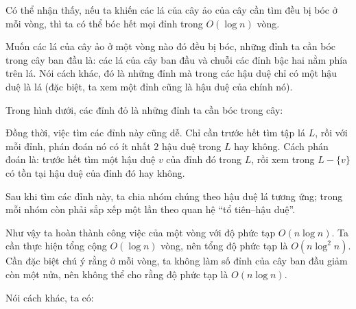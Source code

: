 \documentclass[11pt]{article}
\begin{document}
Có thể nhận thấy, nếu ta khiến các lá của cây ảo của cây cần tìm đều bị bóc ở
mỗi vòng, thì ta có thể bóc hết mọi đỉnh trong \(O(\log n)\) vòng.

Muốn các lá của cây ảo ở một vòng nào đó đều bị bóc, những đỉnh ta cần bóc
trong cây ban đầu là: các lá của cây ban đầu và chuỗi các đỉnh bậc hai nằm phía
trên lá. Nói cách khác, đó là những đỉnh mà trong các hậu duệ chỉ có một hậu duệ
là lá (đặc biệt, ta xem một đỉnh cũng là hậu duệ của chính nó).

Trong hình dưới, các đỉnh đỏ là những đỉnh ta cần bóc trong cây:

\begin{center}
\end{center}

Đồng thời, việc tìm các đỉnh này cũng dễ. Chỉ cần trước hết tìm tập lá \(L\),
rồi với mỗi đỉnh, phán đoán nó có ít nhất \(2\) hậu duệ trong \(L\) hay không.
Cách phán đoán là: trước hết tìm một hậu duệ \(v\) của đỉnh đó trong \(L\), rồi
xem trong \(L-\{v\}\) có tồn tại hậu duệ của đỉnh đó hay không.

Sau khi tìm các đỉnh này, ta chia nhóm chúng theo hậu duệ lá tương ứng; trong
mỗi nhóm còn phải sắp xếp một lần theo quan hệ ``tổ tiên--hậu duệ''.

Như vậy ta hoàn thành công việc của một vòng với độ phức tạp \(O(n\log n)\). Ta
cần thực hiện tổng cộng \(O(\log n)\) vòng, nên tổng độ phức tạp là
\(O(n\log^2 n)\). Cần đặc biệt chú ý rằng ở mỗi vòng, ta không làm số đỉnh của
cây ban đầu giảm còn một nửa, nên không thể cho rằng độ phức tạp là
\(O(n\log n)\).

Nói cách khác, ta có:
\end{document}
